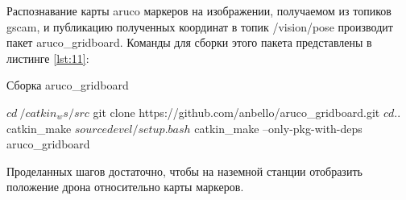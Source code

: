 Распознавание карты aruco маркеров на изображении, получаемом из топиков gscam, и публикацию полученных координат в топик /vision/pose производит пакет aruco\_gridboard. Команды для сборки этого пакета представлены в листинге \ref{lst:11}:
\begin{Program}[H]
	\caption{Сборка aruco\_gridboard} \label{lst:11}
\begin{MyCode}	
$ cd ~/catkin_ws/src
$ git clone https://github.com/anbello/aruco_gridboard.git
$ cd ..
$ catkin_make
$ source devel/setup.bash
$ catkin_make --only-pkg-with-deps aruco_gridboard
\end{MyCode}
\end{Program}

Проделанных шагов достаточно, чтобы на наземной станции отобразить положение дрона относительно карты маркеров.
